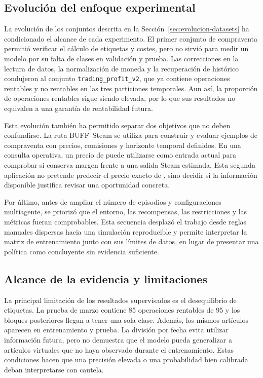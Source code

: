 \subsection{Evolución del enfoque experimental}

La evolución de los conjuntos descrita en la Sección~\ref{sec:evolucion-datasets} ha condicionado el alcance de cada experimento. El primer conjunto de compraventa permitió verificar el cálculo de etiquetas y costes, pero no sirvió para medir un modelo por su falta de clases en validación y prueba. Las correcciones en la lectura de datos, la normalización de moneda y la recuperación de histórico condujeron al conjunto \texttt{trading\_profit\_v2}, que ya contiene operaciones rentables y no rentables en las tres particiones temporales. Aun así, la proporción de operaciones rentables sigue siendo elevada, por lo que sus resultados no equivalen a una garantía de rentabilidad futura.

Esta evolución también ha permitido separar dos objetivos que no deben confundirse. La ruta BUFF--Steam se utiliza para construir y evaluar ejemplos de compraventa con precios, comisiones y horizonte temporal definidos. En una consulta operativa, un precio de  puede utilizarse como entrada actual para comprobar si conserva margen frente a una salida Steam estimada. Esta segunda aplicación no pretende predecir el precio exacto de , sino decidir si la información disponible justifica revisar una oportunidad concreta.

Por último, antes de ampliar el número de episodios y configuraciones multiagente, se priorizó que el entorno, las recompensas, las restricciones y las métricas fueran comprobables. Esta secuencia desplazó el trabajo desde reglas manuales dispersas hacia una simulación reproducible y permite interpretar la matriz de entrenamiento junto con sus límites de datos, en lugar de presentar una política como concluyente sin evidencia suficiente.

\subsection{Alcance de la evidencia y limitaciones}

La principal limitación de los resultados supervisados es el desequilibrio de etiquetas. La prueba de marzo contiene 85 operaciones rentables de 95 y los bloques posteriores llegan a tener una sola clase. Además, los mismos artículos aparecen en entrenamiento y prueba. La división por fecha evita utilizar información futura, pero no demuestra que el modelo pueda generalizar a artículos virtuales que no haya observado durante el entrenamiento. Estas condiciones hacen que una precisión elevada o una probabilidad bien calibrada deban interpretarse con cautela.

